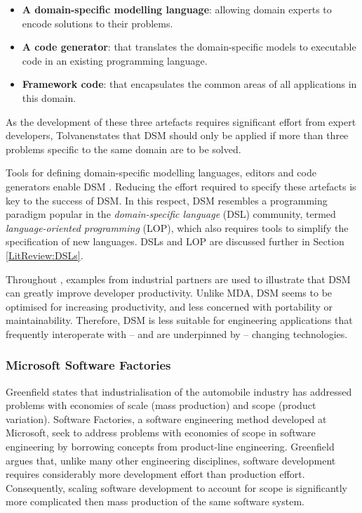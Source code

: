 \begin{itemize}
 \item \textbf{A domain-specific modelling language}: allowing domain experts to encode solutions to their problems.
 \item \textbf{A code generator}: that translates the domain-specific models to executable code in an existing programming language.
 \item \textbf{Framework code}: that encapsulates the common areas of all applications in this domain.
\end{itemize}

As the development of these three artefacts requires significant effort from expert developers, Tolvanen\footnotemark[\value{footnote}] states that DSM should only be applied if more than three problems specific to the same domain are to be solved.

Tools for defining domain-specific modelling languages, editors and code generators enable DSM \cite{kelly08dsm}. Reducing the effort required to specify these artefacts is key to the success of DSM. In this respect, DSM resembles a programming paradigm popular in the \textit{domain-specific language} (DSL) community, termed \textit{language-oriented programming} (LOP), which also requires tools to simplify the specification of new languages. DSLs and LOP are discussed further in Section \ref{LitReview:DSLs}.

Throughout \cite{kelly08dsm}, examples from industrial partners are used to illustrate that DSM can greatly improve developer productivity. Unlike MDA, DSM seems to be optimised for increasing productivity, and less concerned with portability or maintainability. Therefore, DSM is less suitable for engineering applications that frequently interoperate with -- and are underpinned by -- changing technologies.

\subsubsection{Microsoft Software Factories}
Greenfield \cite[pg159]{greenfield04software} states that industrialisation of the automobile industry has addressed problems with economies of scale (mass production) and scope (product variation). Software Factories, a software engineering method developed at Microsoft, seek to address problems with economies of scope in software engineering by borrowing concepts from product-line engineering. Greenfield \cite{greenfield04software} argues that, unlike many other engineering disciplines, software development requires considerably more development effort than production effort. Consequently, scaling software development to account for scope is significantly more complicated then mass production of the same software system.

